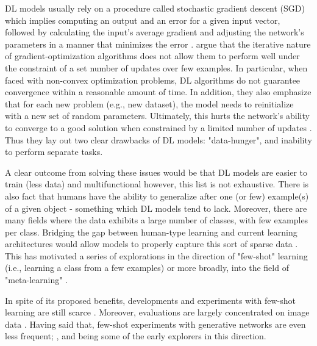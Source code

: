 \documentclass[a4paper]{book}
\begin{document}
DL models usually rely on a procedure called stochastic gradient descent (SGD) which implies computing an output and an error for a given input vector, followed by calculating the input's average gradient and adjusting the network's parameters in a manner that minimizes the error \parencite{lecun_deep_2015}. \textcite{ravi_optimization_2016} argue that the iterative nature of gradient-optimization algorithms does not allow them to perform well under the constraint of a set number of updates over few examples. In particular, when faced with non-convex optimization problems, DL algorithms do not guarantee convergence within a reasonable amount of time. In addition, they also emphasize that for each new problem (e.g., new dataset), the model needs to reinitialize with a new set of random parameters. Ultimately, this hurts the network's ability to converge to a good solution when constrained by a limited number of updates \parencite{ravi_optimization_2016}. Thus they lay out two clear drawbacks of DL models: "data-hunger", and inability to perform separate tasks.

A clear outcome from solving these issues would be that DL models are easier to train (less data) and multifunctional however, this list is not exhaustive. There is also fact that humans have the ability to generalize after one (or few) example(s) of a given object \parencite{vinyals_matching_2016, chen_closer_2018, ravi_optimization_2016} - something which DL models tend to lack. Moreover, there are many fields where the data exhibits a large number of classes, with few examples per class. Bridging the gap between human-type learning and current learning architectures would allow models to properly capture this sort of sparse data \parencite{ravi_optimization_2016, larochelle_few-shot_2017}. This has motivated a series of explorations in the direction of "few-shot" learning (i.e., learning a class from a few examples) or more broadly, into the field of "meta-learning" \parencite[learning to learn in hopes of generalizing to new tasks;][]{chen_closer_2018, vinyals_matching_2016, zhang_metagan_2018}.

In spite of its proposed benefits, developments and experiments with few-shot learning are still scarce \parencite{larochelle_few-shot_2017}. Moreover, evaluations are largely concentrated on image data \parencite[see][]{lake_omniglot_2019, clouatre_figr_2019, vinyals_matching_2016, chen_closer_2018, ravi_optimization_2016}. Having said that, few-shot experiments with generative networks are even less frequent; \textcite{clouatre_figr_2019}, \textcite{dong_musegan_2017} and \textcite{zhang_metagan_2018} being some of the early explorers in this direction.
\end{document}
